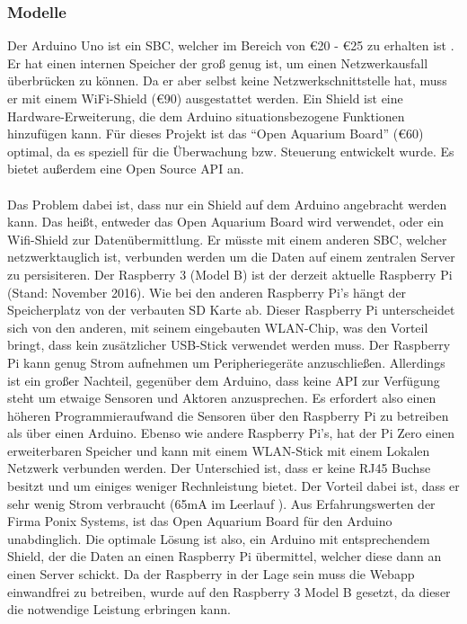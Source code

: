 \subsubsection{Modelle}
Der Arduino Uno ist ein \gls{SBC}, welcher im Bereich von \euro20 - \euro25 zu erhalten ist \cite{AmazonArduino}. Er hat einen internen Speicher der gro{\ss} genug ist, um einen Netzwerkausfall \"uberbr\"ucken zu k\"onnen. Da er aber selbst keine Netzwerkschnittstelle hat, muss er mit einem WiFi-Shield (\euro 90) ausgestattet werden. Ein Shield ist eine Hardware-Erweiterung, die dem Arduino situationsbezogene Funktionen hinzuf\"ugen kann. F\"ur dieses Projekt ist das "`Open Aquarium Board"' (\euro 60) \cite{OpenAquariumBoard} optimal, da es speziell für die \"Uberwachung bzw. Steuerung entwickelt wurde. Es bietet außerdem eine Open Source \gls{API} an. \\ \mbox{} \\
Das Problem dabei ist, dass nur ein Shield auf dem Arduino angebracht werden kann. Das hei{\ss}t, entweder das Open Aquarium Board wird verwendet, oder ein Wifi-Shield zur Daten\"ubermittlung. Er m\"usste mit einem anderen \gls{SBC}, welcher netzwerktauglich ist, verbunden werden um die Daten auf einem zentralen Server zu persisiteren. \cite{ArduinoBoardUno}
\newpage
{}
Der Raspberry 3 (Model B) ist der derzeit aktuelle Raspberry Pi (Stand: November 2016). Wie bei den anderen Raspberry Pi's hängt der Speicherplatz von der verbauten SD Karte ab. Dieser Raspberry Pi unterscheidet sich von den anderen, mit seinem eingebauten \gls{WLAN}-Chip, was den Vorteil bringt, dass kein zusätzlicher \gls{USB}-Stick verwendet werden muss. Der Raspberry Pi kann genug Strom aufnehmen um Peripheriegeräte anzuschließen. Allerdings ist ein großer Nachteil, gegenüber dem Arduino, dass keine API zur Verfügung steht um etwaige Sensoren und Aktoren anzusprechen. Es erfordert also einen höheren Programmieraufwand die Sensoren über den Raspberry Pi zu betreiben als über einen Arduino. 
Ebenso wie andere Raspberry Pi's, hat der Pi Zero einen erweiterbaren Speicher und kann mit einem \gls{WLAN}-Stick mit einem Lokalen Netzwerk verbunden werden. Der Unterschied ist, dass er keine \gls{RJ45} Buchse besitzt und um einiges weniger Rechnleistung bietet. Der Vorteil dabei ist, dass er sehr wenig Strom verbraucht (65mA im Leerlauf \cite{PiPower}).\cite{PiZero}
Aus Erfahrungswerten der Firma Ponix Systems, ist das Open Aquarium Board f\"ur den Arduino unabdinglich. Die optimale L\"osung ist also, ein Arduino mit entsprechendem Shield, der die Daten an einen Raspberry Pi \"ubermittel, welcher diese dann an einen Server schickt. Da der Raspberry in der Lage sein muss die Webapp einwandfrei zu betreiben, wurde auf den Raspberry 3 Model B gesetzt, da dieser die notwendige Leistung erbringen kann. 

